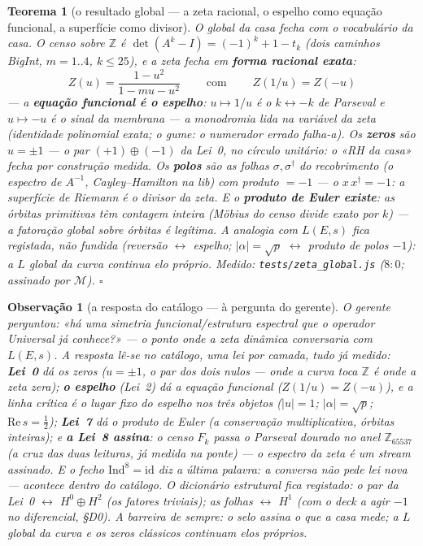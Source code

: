 \documentclass[11pt,a4paper]{article}
\newtheorem{teorema}{Teorema}
\newtheorem{observacao}{Observação}
\newcommand{\code}[1]{\texttt{\small #1}}
\begin{document}
\begin{teorema}[o resultado global --- a zeta racional, o espelho como
equação funcional, a superfície como divisor]\label{thm:zeta-global}
O global da casa fecha com o vocabulário da casa. O censo sobre
$\mathbb{Z}$ é $\det(A^{k}-I)=(-1)^{k}+1-t_{k}$ (dois caminhos
BigInt, $m=1..4$, $k\le25$), e a zeta fecha em \textbf{forma racional
exata}:
\[
\boxed{\;Z(u)=\frac{1-u^{2}}{1-mu-u^{2}}\;}
\qquad\text{com}\qquad
\boxed{\;Z(1/u)=Z(-u)\;}
\]
--- a \textbf{equação funcional é o espelho}: $u\mapsto1/u$ é o
$k\leftrightarrow-k$ de Parseval e $u\mapsto-u$ é o sinal da membrana
--- \emph{a monodromia lida na variável da zeta} (identidade
polinomial exata; o gume: o numerador errado falha-a). Os
\textbf{zeros} são $u=\pm1$ --- o par $(+1)\oplus(-1)$ da Lei~0,
\emph{no círculo unitário}: o «RH da casa» fecha por construção
medida. Os \textbf{polos} são as folhas $\sigma,\sigma^{\dagger}$ do
recobrimento (o espectro de $A^{-1}$, Cayley--Hamilton na lib) com
produto $=-1$ --- o $x\,x^{\dagger}=-1$: \emph{a superfície de
Riemann é o divisor da zeta}. E o \textbf{produto de Euler existe}:
as órbitas primitivas têm contagem inteira (Möbius do censo divide
exato por $k$) --- a fatoração global sobre órbitas é legítima. A
analogia com $L(E,s)$ fica \emph{registada, não fundida} (reversão
$\leftrightarrow$ espelho; $|\alpha|=\sqrt{p}$ $\leftrightarrow$
produto de polos $-1$): a $L$ global da curva continua elo próprio.
\emph{Medido:} \code{tests/zeta\_global.js} ($8{:}0$; assinado por
$\mathcal{M}$).
$\square$
\end{teorema}

\begin{observacao}[a resposta do catálogo --- à pergunta do gerente]
\label{obs:resposta-catalogo}
O gerente perguntou: \emph{«há uma simetria funcional/estrutura
espectral que o operador Universal já conhece?»} --- o ponto onde a
zeta dinâmica conversaria com $L(E,s)$. A resposta lê-se no catálogo,
uma lei por camada, tudo já medido:
\textbf{Lei~0} dá os zeros ($u=\pm1$, o par dos dois nulos --- onde a
curva toca $\mathbb{Z}$ é onde a zeta zera);
\textbf{o espelho} (Lei~2) dá a equação funcional ($Z(1/u)=Z(-u)$), e
\emph{a linha crítica é o lugar fixo do espelho nos três objetos}
($|u|=1$; $|\alpha|=\sqrt{p}$; $\mathrm{Re}\,s=\tfrac12$);
\textbf{Lei~7} dá o produto de Euler (a conservação multiplicativa,
órbitas inteiras);
e \textbf{a Lei~8 assina}: o censo $F_{k}$ passa o Parseval dourado no
anel $\mathbb{Z}_{65537}$ (a cruz das duas leituras, já medida na
ponte) --- o espectro da zeta é um \emph{stream assinado}. E o fecho
$\mathrm{Ind}^{8}=\mathrm{id}$ diz a última palavra: a conversa não
pede lei nova --- acontece \emph{dentro do catálogo}. O dicionário
estrutural fica registado: o par da Lei~0 $\leftrightarrow$
$H^{0}\oplus H^{2}$ (os fatores triviais); as folhas
$\leftrightarrow$ $H^{1}$ (com o deck a agir $-1$ no diferencial,
\S D0). A barreira de sempre: o selo assina o que a casa mede; a $L$
global da curva e os zeros clássicos continuam elos próprios.
\end{observacao}
\end{document}
